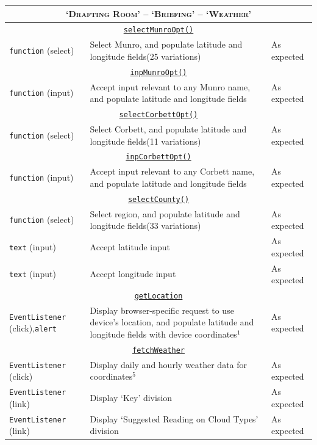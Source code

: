 \documentclass[11pt, english]{article}
\begin{document}
\begin{center}
\begin{longtable}{p{3cm}p{8cm}p{2cm}}
		\hline
		\multicolumn{3}{c}{\textsc{`Drafting Room' -- `Briefing' -- `Weather'}}\\
		\hline
		\multicolumn{3}{c}{\underline{\texttt{selectMunroOpt()}}}\\
		\texttt{function} (select) & Select Munro, and populate latitude and longitude fields\newline (25 variations) & As expected\\
		\multicolumn{3}{c}{\underline{\texttt{inpMunroOpt()}}}\\
		\texttt{function} (input) & Accept input relevant to any Munro name, and populate latitude and longitude fields & As expected\\
		\multicolumn{3}{c}{\underline{\texttt{selectCorbettOpt()}}}\\
		\texttt{function} (select) & Select Corbett, and populate latitude and longitude fields\newline (11 variations) & As expected\\
		\multicolumn{3}{c}{\underline{\texttt{inpCorbettOpt()}}}\\
		\texttt{function} (input) & Accept input relevant to any Corbett name, and populate latitude and longitude fields & As expected\\
		\multicolumn{3}{c}{\underline{\texttt{selectCounty()}}}\\
		\texttt{function} (select) & Select region, and populate latitude and longitude fields\newline (33 variations) & As expected\\
		\texttt{text} (input) & Accept latitude input & As expected\\
		\texttt{text} (input) & Accept longitude input & As expected\\
		\multicolumn{3}{c}{\underline{\texttt{getLocation}}}\\
		\texttt{EventListener} (click),\newline \texttt{alert} & Display browser-specific request to use device's location, and populate latitude and longitude fields with device coordinates$^{1}$ & As expected\\
		\multicolumn{3}{c}{\underline{\texttt{fetchWeather}}}\\
		\texttt{EventListener} (click) & Display daily and hourly weather data for coordinates$^{5}$ & As expected\\
		\texttt{EventListener} (link) & Display `Key' division & As expected\\
		\texttt{EventListener} (link) & Display `Suggested Reading on Cloud Types' division & As expected\\

\end{longtable}
\end{center}
\end{document}
